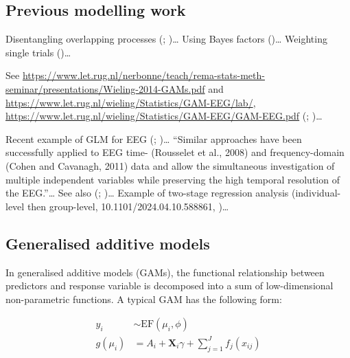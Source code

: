 \documentclass[
  doc,
  floatsintext,
  longtable,
  a4paper,
  nolmodern,
  notxfonts,
  notimes,
  colorlinks=true,linkcolor=blue,citecolor=blue,urlcolor=blue]{apa7}
\begin{document}
\subsection{Previous modelling work}\label{previous-modelling-work}

Disentangling overlapping processes
(;
)\ldots{}
Using Bayes factors ()\ldots{} Weighting single trials ()\ldots{}

See
\url{https://www.let.rug.nl/nerbonne/teach/rema-stats-meth-seminar/presentations/Wieling-2014-GAMs.pdf}
and \url{https://www.let.rug.nl/wieling/Statistics/GAM-EEG/lab/},
\url{https://www.let.rug.nl/wieling/Statistics/GAM-EEG/GAM-EEG.pdf}
(;
)\ldots{}

Recent example of GLM for EEG (; )\ldots{} ``Similar approaches have been successfully applied to
EEG time- (Rousselet et al., 2008) and frequency-domain (Cohen and
Cavanagh, 2011) data and allow the simultaneous investigation of
multiple independent variables while preserving the high temporal
resolution of the EEG.''\ldots{} See also (; )\ldots{} Example of two-stage regression analysis
(individual-level then group-level, 10.1101/2024.04.10.588861,
)\ldots{}

\subsection{Generalised additive
models}\label{generalised-additive-models}

In generalised additive models (GAMs), the functional relationship
between predictors and response variable is decomposed into a sum of
low-dimensional non-parametric functions. A typical GAM has the
following form:

\[
\begin{aligned} 
y_{i} &\sim \mathrm{EF}\left(\mu_{i}, \phi\right)\\
g\left(\mu_i\right) &= A_{i} + \mathbf{X}_{i} \gamma + \sum_{j=1}^{J} f_{j}\left(x_{ij}\right)
\end{aligned}
\]
\end{document}
